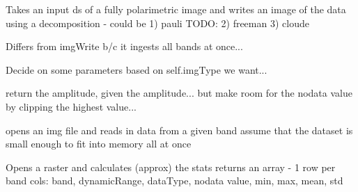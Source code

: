 \documentclass[letterpaper,10pt,english]{sphinxmanual}
\begin{document}
\begin{fulllineitems}
\begin{fulllineitems}
\begin{description}
\end{description}

\end{fulllineitems}


\begin{fulllineitems}
\label{code:Image.Image.decomp}
Takes an input ds of a fully polarimetric image and writes an image of
the data using a decomposition - could be 1) pauli
TODO: 2) freeman 3) cloude

Differs from imgWrite b/c it ingests all bands at once...

\end{fulllineitems}


\begin{fulllineitems}
\label{code:Image.Image.fnameGenerate}
Decide on some parameters based on self.imgType we want...

\end{fulllineitems}


\begin{fulllineitems}
\label{code:Image.Image.getAmp}
return the amplitude, given the amplitude... but make room for
the nodata value by clipping the highest value...

\end{fulllineitems}


\begin{fulllineitems}
\label{code:Image.Image.getBandData}
opens an img file and reads in data from a given band
assume that the dataset is small enough to fit into memory all at once

\end{fulllineitems}


\begin{fulllineitems}
\label{code:Image.Image.getImgStats}
Opens a raster and calculates (approx) the stats
returns an array - 1 row per band
cols: band, dynamicRange, dataType, nodata value, min, max, mean, std


\end{fulllineitems}
\end{fulllineitems}
\end{document}
